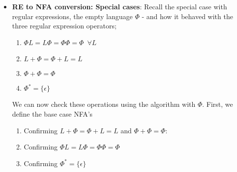 \documentclass{report}
\begin{document}
\begin{itemize}
\item \textbf{RE to NFA conversion: Special cases}: Recall the special case with regular expressions, the empty language $\Phi$ - and how it behaved with the three regular expression operators;
    \begin{enumerate}
        \item $\Phi L  = L\Phi = \Phi\Phi = \Phi$\ $\forall L$
        \item $L + \Phi = \Phi + L = L $
        \item $\Phi + \Phi = \Phi $
        \item $\Phi^{*} = \{\epsilon\} $
    \end{enumerate}
    \bigbreak \noindent 
    \pagebreak \bigbreak \noindent 
    We can now check these operations using the algorithm with $\Phi $. First, we define the base case NFA's
    \bigbreak \noindent 
    \begin{figure}[ht]
        \centering
        \label{fig:base}
    \end{figure}
    \bigbreak \noindent 
    \begin{enumerate}
        \item Confirming $L+\Phi = \Phi+L= L$ and $\Phi+\Phi = \Phi$:
            \bigbreak \noindent 
            \begin{figure}[ht]
                \centering
                \label{fig:base2}
            \end{figure}
            \pagebreak 
        \item Confirming $\Phi L = L\Phi = \Phi\Phi = \Phi$
            \bigbreak \noindent 
            \begin{figure}[ht]
                \centering
                \label{fig:base6}
            \end{figure}
        \item Confirming $\Phi^{*} = \{\epsilon\}$
            \bigbreak \noindent 
            \begin{figure}[ht]
                \centering
                \label{fig:base7}
            \end{figure}
    \end{enumerate}


\end{itemize}
\end{document}
